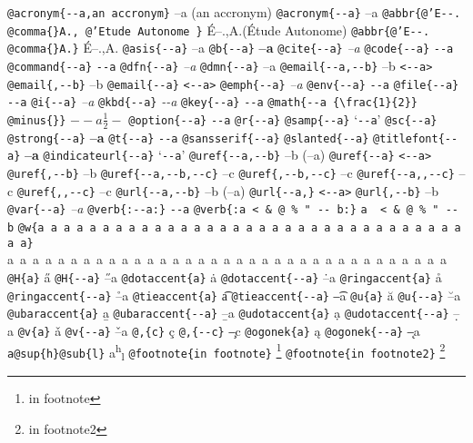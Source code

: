 \documentclass{book}
\begin{document}
\texttt{@acronym\{{-}{-}a,an accronym\}} --a (an accronym)
\texttt{@acronym\{{-}{-}a\}} --a
\texttt{@abbr\{@'E{-}{-}. @comma\{\}A., @'Etude Autonome \}} \'{E}--.\@ ,A.\@ (\'{E}tude Autonome)
\texttt{@abbr\{@'E{-}{-}. @comma\{\}A.\}} \'{E}--.\@ ,A.\@
\texttt{@asis\{{-}{-}a\}} --a
\texttt{@b\{{-}{-}a\}} \textbf{--a}
\texttt{@cite\{{-}{-}a\}} \textit{--a}
\texttt{@code\{{-}{-}a\}} \texttt{{-}{-}a}
\texttt{@command\{{-}{-}a\}} \texttt{{-}{-}a}
\texttt{@dfn\{{-}{-}a\}} \emph{--a}
\texttt{@dmn\{{-}{-}a\}} --a
\texttt{@email\{{-}{-}a,{-}{-}b\}} --b \texttt{<{-}{-}a>}
\texttt{@email\{,{-}{-}b\}} --b
\texttt{@email\{{-}{-}a\}} \texttt{<{-}{-}a>}
\texttt{@emph\{{-}{-}a\}} \emph{--a}
\texttt{@env\{{-}{-}a\}} \texttt{{-}{-}a}
\texttt{@file\{{-}{-}a\}} \texttt{{-}{-}a}
\texttt{@i\{{-}{-}a\}} \textit{--a}
\texttt{@kbd\{{-}{-}a\}} {\ttfamily\textsl{{-}{-}a}}
\texttt{@key\{{-}{-}a\}} \texttt{{-}{-}a}
\texttt{@math\{{-}{-}a \{\textbackslash{}frac\{1\}\{2\}\} @minus\{\}\}} $--a {\frac{1}{2}} -$
\texttt{@option\{{-}{-}a\}} \texttt{{-}{-}a}
\texttt{@r\{{-}{-}a\}} 
\texttt{@samp\{{-}{-}a\}} `\texttt{{-}{-}a}'
\texttt{@sc\{{-}{-}a\}} 
\texttt{@strong\{{-}{-}a\}} \textbf{--a}
\texttt{@t\{{-}{-}a\}} \texttt{{-}{-}a}
\texttt{@sansserif\{{-}{-}a\}} 
\texttt{@slanted\{{-}{-}a\}} 
\texttt{@titlefont\{{-}{-}a\}} {\Huge \bfseries --a}
\texttt{@indicateurl\{{-}{-}a\}} `\texttt{{-}{-}a}'
\texttt{@uref\{{-}{-}a,{-}{-}b\}} --b (--a)
\texttt{@uref\{{-}{-}a\}} \texttt{<{-}{-}a>}
\texttt{@uref\{,{-}{-}b\}} --b
\texttt{@uref\{{-}{-}a,{-}{-}b,{-}{-}c\}} --c
\texttt{@uref\{,{-}{-}b,{-}{-}c\}} --c
\texttt{@uref\{{-}{-}a,,{-}{-}c\}} --c
\texttt{@uref\{,,{-}{-}c\}} --c
\texttt{@url\{{-}{-}a,{-}{-}b\}} --b (--a)
\texttt{@url\{{-}{-}a,\}} \texttt{<{-}{-}a>}
\texttt{@url\{,{-}{-}b\}} --b
\texttt{@var\{{-}{-}a\}} \emph{--a}
\texttt{@verb\{:{-}{-}a:\}} \verb:--a:
\texttt{@verb\{:a  < \& @ \% " {-}{-}    b:\}} \verb:a  < & @ % " --    b:
\texttt{@w\{a a a a a a a a a a a a a a a a a a a a a a a a a a a a a a a a a a a\}} \hbox{a a a a a a a a a a a a a a a a a a a a a a a a a a a a a a a a a a a}
\texttt{@H\{a\}} \H{a}
\texttt{@H\{{-}{-}a\}} \H{--a}
\texttt{@dotaccent\{a\}} \.{a}
\texttt{@dotaccent\{{-}{-}a\}} \.{--a}
\texttt{@ringaccent\{a\}} \r{a}
\texttt{@ringaccent\{{-}{-}a\}} \r{--a}
\texttt{@tieaccent\{a\}} \t{a}
\texttt{@tieaccent\{{-}{-}a\}} \t{--a}
\texttt{@u\{a\}} \u{a}
\texttt{@u\{{-}{-}a\}} \u{--a}
\texttt{@ubaraccent\{a\}} \b{a}
\texttt{@ubaraccent\{{-}{-}a\}} \b{--a}
\texttt{@udotaccent\{a\}} \d{a}
\texttt{@udotaccent\{{-}{-}a\}} \d{--a}
\texttt{@v\{a\}} \v{a}
\texttt{@v\{{-}{-}a\}} \v{--a}
\texttt{@,\{c\}} \c{c}
\texttt{@,\{{-}{-}c\}} \c{--c}
\texttt{@ogonek\{a\}} \k{a}
\texttt{@ogonek\{{-}{-}a\}} \k{--a}
\texttt{a@sup\{h\}@sub\{l\}} a\textsuperscript{h}\textsubscript{l}
\texttt{@footnote\{in footnote\}} \footnote{in footnote}
\texttt{@footnote\{in footnote2\}} \footnote{in footnote2}
\end{document}

